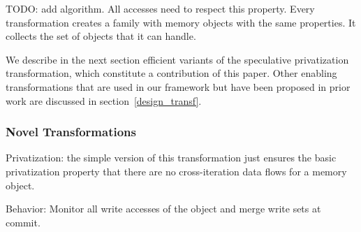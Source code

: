 TODO: add algorithm. All accesses need to respect this property. Every
transformation creates a family with memory objects with the same
properties.  It collects the set of objects that it can handle.


We describe in the next section efficient variants of the speculative
privatization transformation, which constitute a contribution of this
paper.  Other enabling transformations that are used in our framework
but have been proposed in prior work are discussed in
section~\ref{design_transf}.

\subsubsection{Novel Transformations}
\label{novel_transf}

%

Privatization: the simple version of this transformation just
ensures the basic privatization property that there are no
cross-iteration data flows for a memory object.

Behavior: Monitor all write accesses of the object and merge write
sets at commit.

